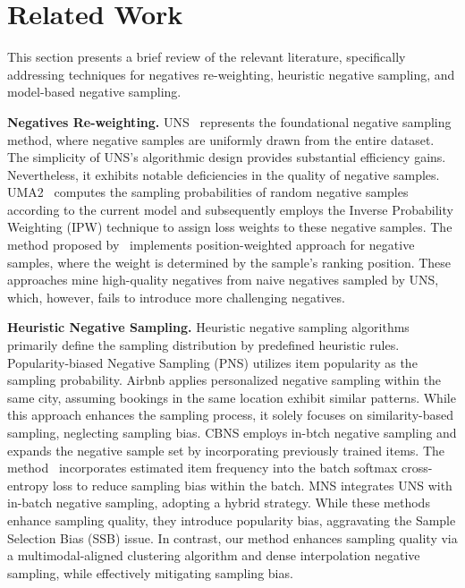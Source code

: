 \section{Related Work}
\label{sec:related}
This section presents a brief review of the relevant literature, specifically addressing techniques for negatives re-weighting, heuristic negative sampling, and model-based negative sampling.



\noindent \textbf{Negatives Re-weighting.}
UNS\ \citep{rendle2012bpr, he2017neural} represents the foundational negative sampling method, where negative samples are uniformly drawn from the entire dataset. The simplicity of UNS’s algorithmic design provides substantial efficiency gains. Nevertheless, it exhibits notable deficiencies in the quality of negative samples. UMA2\ \citep{lou2022re} computes the sampling probabilities of random negative samples according to the current model and subsequently employs the Inverse Probability Weighting (IPW) technique to assign loss weights to these negative samples. The method proposed by\ \citep{rendle2014improving} implements position-weighted approach for negative samples, where the weight is determined by the sample's ranking position. These approaches mine high-quality negatives from naive negatives sampled by UNS, which, however, fails to introduce more challenging negatives.


\noindent \textbf{Heuristic Negative Sampling.}
Heuristic negative sampling algorithms primarily define the sampling distribution by predefined heuristic rules. Popularity-biased Negative Sampling (PNS) \citep{chen2017sampling} utilizes item popularity as the sampling probability. Airbnb \citep{grbovic2018real} applies personalized negative sampling within the same city, assuming bookings in the same location exhibit similar patterns. While this approach enhances the sampling process, it solely focuses on similarity-based sampling, neglecting sampling bias. CBNS \citep{wang2021cross} employs in-btch negative sampling and expands the negative sample set by incorporating previously trained items. The method\ \citep{yi2019sampling} incorporates estimated item frequency into the batch softmax cross-entropy loss to reduce sampling bias within the batch. MNS \citep{yang2020mixed} integrates UNS with in-batch negative sampling, adopting a hybrid strategy. While these methods enhance sampling quality, they introduce popularity bias, aggravating the Sample Selection Bias (SSB) issue. In contrast, our method enhances sampling quality via a multimodal-aligned clustering algorithm and dense interpolation negative sampling, while effectively mitigating sampling bias.

